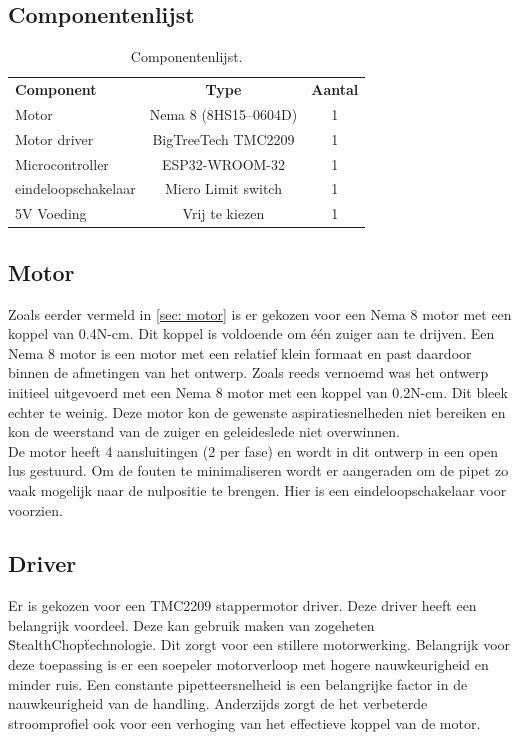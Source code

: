 \subsection{Componentenlijst}
\begin{table}[H]
    \begin{tabular}{l|c|c}
        \textbf{Component} & \textbf{Type} & \textbf{Aantal} \\
        Motor & Nema 8 (8HS15--0604D)& 1 \\
        Motor driver & BigTreeTech TMC2209 & 1 \\
        Microcontroller & ESP32-WROOM-32 & 1 \\
        eindeloopschakelaar & Micro Limit switch & 1 \\
        5V Voeding & Vrij te kiezen\footnotemark & 1 \\
        \hline
    \end{tabular}
    \caption{Componentenlijst.}\label{tab:componentenlijst}
\end{table}
\subsection{Motor}
Zoals eerder vermeld in \autoref{sec: motor} is er gekozen voor een Nema 8 motor met een koppel van 0.4N-cm. Dit koppel is voldoende om één zuiger aan te drijven. Een Nema 8 motor is een motor met een relatief klein formaat en past daardoor binnen de afmetingen van het ontwerp. Zoals reeds vernoemd was het ontwerp initieel uitgevoerd met een Nema 8 motor met een koppel van 0.2N-cm. Dit bleek echter te weinig. Deze motor kon de gewenste aspiratiesnelheden niet bereiken en kon de weerstand van de zuiger en geleideslede niet overwinnen.
\\[12pt]De motor heeft 4 aansluitingen (2 per fase) en wordt in dit ontwerp in een open lus gestuurd. Om de fouten te minimaliseren wordt er aangeraden om de pipet zo vaak mogelijk naar de nulpositie te brengen. Hier is een eindeloopschakelaar voor voorzien.
\subsection{Driver}
Er is gekozen voor een TMC2209 stappermotor driver. Deze driver heeft een belangrijk voordeel. Deze kan gebruik maken van zogeheten \"StealthChop\" technologie. Dit zorgt voor een stillere motorwerking. Belangrijk voor deze toepassing is er een soepeler motorverloop met hogere nauwkeurigheid en minder ruis. Een constante pipetteersnelheid is een belangrijke factor in de nauwkeurigheid van de handling. Anderzijds zorgt de het verbeterde stroomprofiel ook voor een verhoging van het effectieve koppel van de motor.\ \cite{RN45}
